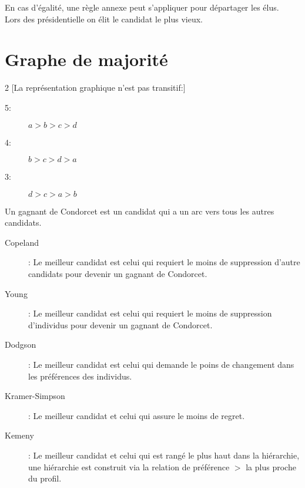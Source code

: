 En cas d'égalité, une règle annexe peut s'appliquer pour départager les élus.\\
Lors des présidentielle on élit le candidat le plus vieux.\\

\pagebreak
\section{Graphe de majorité}

\begin{multicols}{2}
[La représentation graphique n'est pas transitif:]
\begin{description}
\item[5:] $a > b > c > d$
\item[4:] $b > c > d > a$
\item[3:] $d > c > a > b$
\end{description}
\end{multicols}

Un gagnant de Condorcet est un candidat qui a un arc vers tous les autres candidats.\\

\begin{description}
\item[Copeland]: Le meilleur candidat est celui qui requiert le moins de suppression d'autre candidats pour devenir un gagnant de Condorcet.
\item[Young]: Le meilleur candidat est celui qui requiert le moins de suppression d'individus pour devenir un gagnant de Condorcet.
\item[Dodgson]: Le meilleur candidat est celui qui demande le poins de changement dans les préférences des individus.
\item[Kramer-Simpson]: Le meilleur candidat et celui qui assure le moins de regret.
\item[Kemeny]: Le meilleur candidat et celui qui est rangé le plus haut dans la hiérarchie, une hiérarchie est construit via la relation de préférence $>$ la plus proche du profil.
\end{description}

